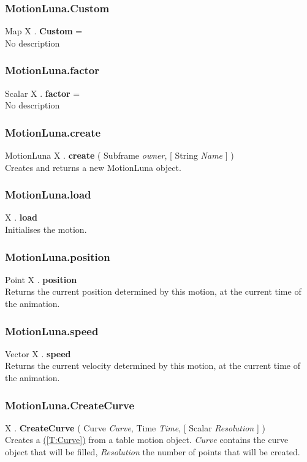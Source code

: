 \documentclass[10pt]{book}
\newcommand{\linkitem}[1]{\hyperref[#1]{\nameref{#1} (\ref{#1})}}
\newcommand{\var}[1]{\textit{#1}}
\begin{document}
\subsubsection{MotionLuna.Custom \label{F:MotionLuna:Custom}}
Map X . \textbf{Custom} = \\
No description

\subsubsection{MotionLuna.factor \label{F:MotionLuna:factor}}
Scalar X . \textbf{factor} = \\
No description

\subsubsection{MotionLuna.create \label{F:MotionLuna:create}}
MotionLuna X . \textbf{create} ( Subframe \textit{owner},  [ String \textit{Name} ] ) \\
Creates and returns a new MotionLuna object.

\subsubsection{MotionLuna.load \label{F:MotionLuna:load}}
X . \textbf{load} \\
Initialises the motion.

\subsubsection{MotionLuna.position \label{F:MotionLuna:position}}
Point X . \textbf{position} \\
Returns the current position determined by this motion, at the current time of the animation.


\subsubsection{MotionLuna.speed \label{F:MotionLuna:speed}}
Vector X . \textbf{speed} \\
Returns the current velocity determined by this motion, at the current time of the animation.


\subsubsection{MotionLuna.CreateCurve \label{F:MotionLuna:CreateCurve}}
X . \textbf{CreateCurve} ( Curve \textit{Curve}, Time \textit{Time},  [ Scalar \textit{Resolution} ] ) \\
Creates a \linkitem{T:Curve} from a table motion object. \var{Curve} contains the curve object that will be filled, \var{Resolution} the number of points that will be created.
\end{document}
